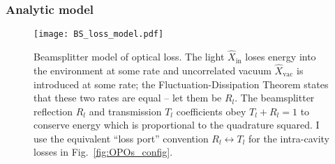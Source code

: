 
\subsubsection{Analytic model}
\label{sec:dOPO_model}

\begin{figure}
	\centering
	\texttt{[image: BS\_loss\_model.pdf]}
	\caption{Beamsplitter model of optical loss. The light $\hat X_\text{in}$ loses energy into the environment at some rate and uncorrelated vacuum $\hat X_\text{vac}$ is introduced at some rate; the Fluctuation-Dissipation Theorem states that these two rates are equal -- let them be $R_l$. The beamsplitter reflection $R_l$ and transmission $T_l$ coefficients obey $T_l+R_l=1$ to conserve energy which is proportional to the quadrature squared. I use the equivalent ``loss port'' convention $R_l\leftrightarrow T_l$ for the intra-cavity losses in Fig.~\ref{fig:OPOs_config}.}
	\label{fig:beamsplitter_loss}
\end{figure}


